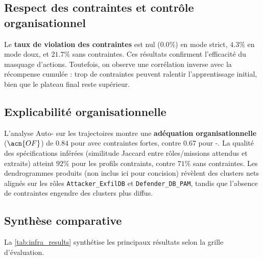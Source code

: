 \subsection*{Respect des contraintes et contrôle organisationnel}

Le \textbf{taux de violation des contraintes} est nul ($0.0\%$) en mode strict, $4.3\%$ en mode doux, et $21.7\%$ sans contraintes.
Ces résultats confirment l’efficacité du masquage d’actions.
Toutefois, on observe une corrélation inverse avec la récompense cumulée : trop de contraintes peuvent ralentir l’apprentissage initial, bien que le plateau final reste supérieur.

\subsection*{Explicabilité organisationnelle}

L’analyse Auto- sur les trajectoires montre une \textbf{adéquation organisationnelle} ($\acn{OF}$) de $0.84$ pour  avec contraintes fortes, contre $0.67$ pour -.
La qualité des spécifications inférées (similitude Jaccard entre rôles/missions attendus et extraits) atteint $92\%$ pour les profils contraints, contre $71\%$ sans contraintes.
Les dendrogrammes produits (non inclus ici pour concision) révèlent des clusters nets alignés sur les rôles \texttt{Attacker\_ExfilDB} et \texttt{Defender\_DB\_PAM}, tandis que l’absence de contraintes engendre des clusters plus diffus.

\subsection*{Synthèse comparative}

La \autoref{tab:infra_results} synthétise les principaux résultats selon la grille d’évaluation.


